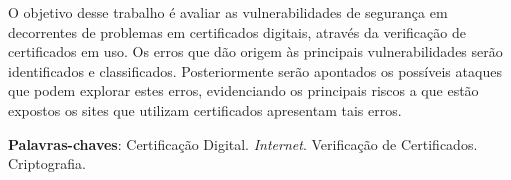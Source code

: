 \begin{resumo}
	O objetivo desse trabalho é avaliar as vulnerabilidades de segurança em decorrentes de problemas em certificados digitais, através da verificação de certificados em uso. Os erros que dão origem às principais vulnerabilidades serão identificados e classificados. Posteriormente serão apontados os possíveis ataques que podem explorar estes erros, evidenciando os principais riscos a que estão expostos os sites que utilizam certificados apresentam tais erros.

\vspace{\onelineskip}
    
\noindent
\textbf{Palavras-chaves}: Certificação Digital. \textit{Internet}. Verificação de Certificados. Criptografia.
\end{resumo}
